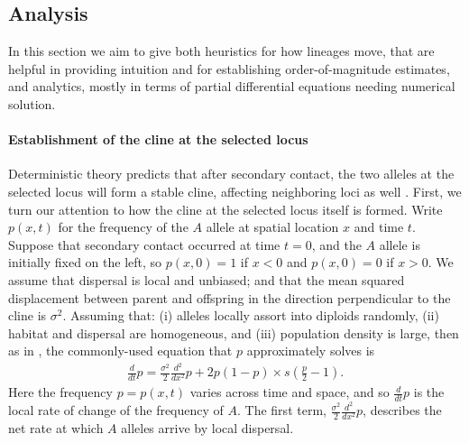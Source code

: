 \documentclass[11pt,letterpaper]{article}
\newcommand{\alisa}[1]{{\em \color{red} #1}}
\begin{document}
\subsection*{Analysis}

In this section we aim to give both heuristics for how lineages move, 
that are helpful in providing intuition and for establishing order-of-magnitude estimates,
and analytics, mostly in terms of partial differential equations needing numerical solution. 

\paragraph{Establishment of the cline at the selected locus}
Deterministic theory predicts that after secondary contact,
the two alleles at the selected locus will form a stable cline,
affecting neighboring loci as well \citep{barton1979gene, barton1986barrier}.
First, we turn our attention to how the cline at the selected locus itself is formed.
Write $p(x,t)$ for the frequency of the $A$ allele at spatial location $x$ and time $t$.  
Suppose that secondary contact occurred at time $t=0$, 
and the $A$ allele is initially fixed on the left, so
$p(x,0) = 1$ if $x<0$ and $p(x,0)=0$ if $x>0$.
We assume that dispersal is local and unbiased;
and that the mean squared displacement between parent and offspring
in the direction perpendicular to the cline
is $\sigma^2$.
Assuming that: (i) alleles locally assort into diploids randomly, 
(ii) habitat and dispersal are homogeneous,
and (iii) population density is large,
then as in \citet{Bazykin1969},
the commonly-used equation that $p$ approximately solves is
\begin{align} \label{eqn:cline_pde}
    \frac{d}{dt} p = \frac{\sigma^2}{2} \frac{d^2}{dx^2} p +  2 p (1-p)  \times s (\frac{p}{2} - 1).
\end{align}
Here the frequency $p=p(x,t)$ varies across time and space,
and so $ \frac{d}{dt} p$ is the local rate of change of the frequency of $A$.
The first term, $\frac{\sigma^2}{2} \frac{d^2}{dx^2} p$, describes the net rate at which $A$ alleles arrive by local dispersal.
\end{document}
